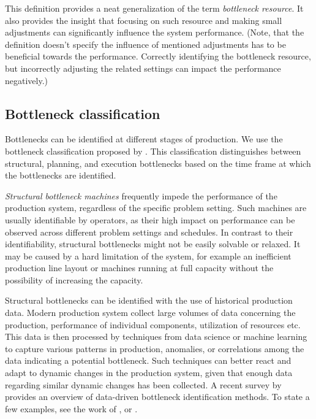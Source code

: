 This definition provides a neat generalization of the term \emph{bottleneck resource}.
It also provides the insight that focusing on such resource and making small adjustments
can significantly influence the system performance.
(Note, that the definition doesn't specify the influence of mentioned adjustments has to be beneficial towards the performance.
Correctly identifying the bottleneck resource, but incorrectly adjusting the related settings can impact the performance negatively.)

\subsection{Bottleneck classification} \label{subsec:related-works/bottlenecks-in-scheduling/bottleneck-classification}

Bottlenecks can be identified at different stages of production.
We use the bottleneck classification proposed by \citet{Wang2016}.
This classification distinguishes between structural, planning, and execution bottlenecks
based on the time frame at which the bottlenecks are identified.

\emph{Structural bottleneck machines} frequently impede the performance of the production system,
regardless of the specific problem setting.
Such machines are usually identifiable by operators,
as their high impact on performance can be observed across different problem settings and schedules.
In contrast to their identifiability, structural bottlenecks might not be easily solvable or relaxed.
It may be caused by a hard limitation of the system,
for example an inefficient production line layout or
machines running at full capacity without the possibility of increasing the capacity.

Structural bottlenecks can be identified with the use of historical production data.
Modern production system collect large volumes of data concerning the production,
performance of individual components, utilization of resources etc.
This data is then processed by techniques from data science or machine learning
to capture various patterns in production, anomalies, or correlations among the data
indicating a potential bottleneck.
Such techniques can better react and adapt to dynamic changes in the production system,
given that enough data regarding similar dynamic changes has been collected.
A recent survey by \citet{Subramaniyan2021} provides an overview of data-driven bottleneck identification methods.
To state a few examples, see the work of \citet{Subramaniyan2016}, \citet{Roh2018} or \citet{Li2009}.

